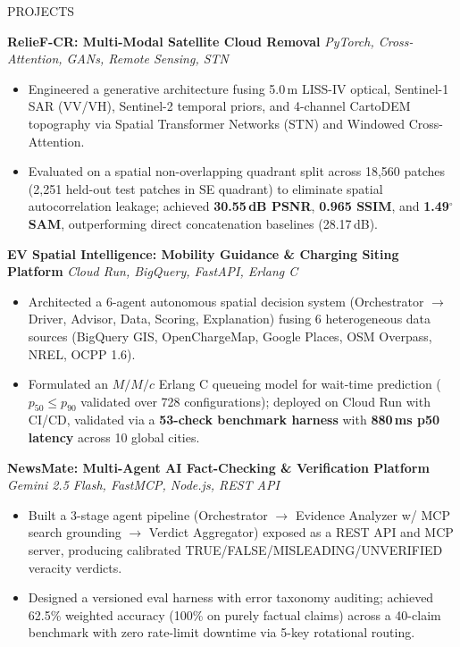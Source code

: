 \documentclass[letterpaper]{resume}
\begin{document}

\begin{rSection}{PROJECTS}

\textbf{RelieF-CR: Multi-Modal Satellite Cloud Removal} \hfill
{\it PyTorch, Cross-Attention, GANs, Remote Sensing, STN}
\begin{itemize}
  \item Engineered a generative architecture fusing 5.0\,m LISS-IV optical, Sentinel-1 SAR (VV/VH), Sentinel-2 temporal priors, and 4-channel CartoDEM topography via Spatial Transformer Networks (STN) and Windowed Cross-Attention.
  \item Evaluated on a spatial non-overlapping quadrant split across 18,560 patches (2,251 held-out test patches in SE quadrant) to eliminate spatial autocorrelation leakage; achieved \textbf{30.55\,dB PSNR}, \textbf{0.965 SSIM}, and \textbf{1.49$^\circ$ SAM}, outperforming direct concatenation baselines (28.17\,dB).
\end{itemize}

\textbf{EV Spatial Intelligence: Mobility Guidance \& Charging Siting Platform} \hfill
{\it Cloud Run, BigQuery, FastAPI, Erlang C}
\begin{itemize}
  \item Architected a 6-agent autonomous spatial decision system (Orchestrator $\rightarrow$ Driver, Advisor, Data, Scoring, Explanation) fusing 6 heterogeneous data sources (BigQuery GIS, OpenChargeMap, Google Places, OSM Overpass, NREL, OCPP 1.6).
  \item Formulated an $M/M/c$ Erlang C queueing model for wait-time prediction ($p_{50} \le p_{90}$ validated over 728 configurations); deployed on Cloud Run with CI/CD, validated via a \textbf{53-check benchmark harness} with \textbf{880\,ms p50 latency} across 10 global cities.
\end{itemize}

\textbf{NewsMate: Multi-Agent AI Fact-Checking \& Verification Platform} \hfill
{\it Gemini 2.5 Flash, FastMCP, Node.js, REST API}
\begin{itemize}
  \item Built a 3-stage agent pipeline (Orchestrator $\rightarrow$ Evidence Analyzer w/ MCP search grounding $\rightarrow$ Verdict Aggregator) exposed as a REST API and MCP server, producing calibrated TRUE/FALSE/MISLEADING/UNVERIFIED veracity verdicts.
  \item Designed a versioned eval harness with error taxonomy auditing; achieved 62.5\% weighted accuracy (100\% on purely factual claims) across a 40-claim benchmark with zero rate-limit downtime via 5-key rotational routing.
\end{itemize}


\end{rSection}
\end{document}
